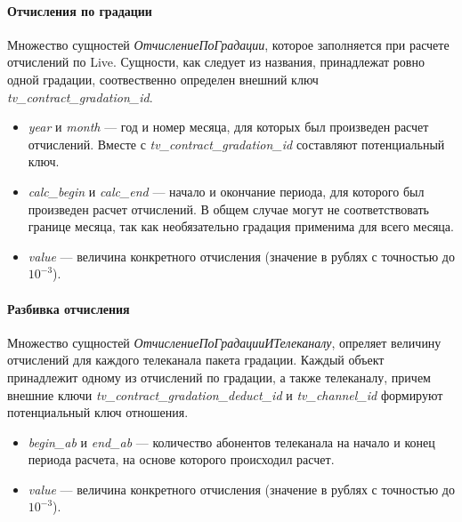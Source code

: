 \paragraph{Отчисления по градации} Множество сущностей \textit{ОтчислениеПоГрадации}, которое заполняется 
при расчете отчислений по Live. Сущности, как следует из названия, принадлежат ровно одной градации, соотвественно определен
внешний ключ \textit{tv\_contract\_gradation\_id}.
\begin{itemize}
\item{
  \textit{year} и \textit{month} --- год и номер месяца, для которых был произведен расчет отчислений. 
  Вместе с \textit{tv\_contract\_gradation\_id} составляют потенциальный ключ.
}
\item{
  \textit{calc\_begin} и \textit{calc\_end} --- начало и окончание периода, для которого был произведен расчет отчислений.
  В общем случае могут не соответствовать границе месяца, так как необязательно градация применима для всего месяца.
}
\item{
  \textit{value} --- величина конкретного отчисления (значение в рублях с точностью до $10^{-3}$). 
}
\end{itemize}

\paragraph{Разбивка отчисления} Множество сущностей \textit{ОтчислениеПоГрадацииИТелеканалу}, опреляет величину отчислений
для каждого телеканала пакета градации. 
Каждый объект принадлежит одному из отчислений по градации, а также телеканалу, причем внешние ключи
\textit{tv\_contract\_gradation\_deduct\_id} и \textit{tv\_channel\_id} формируют потенциальный ключ отношения.
\begin{itemize}
\item{
  \textit{begin\_ab} и \textit{end\_ab} --- количество абонентов телеканала на начало и конец периода расчета, 
на основе которого происходил расчет.
}
\item{
  \textit{value} --- величина конкретного отчисления (значение в рублях с точностью до $10^{-3}$). 
}
\end{itemize}


